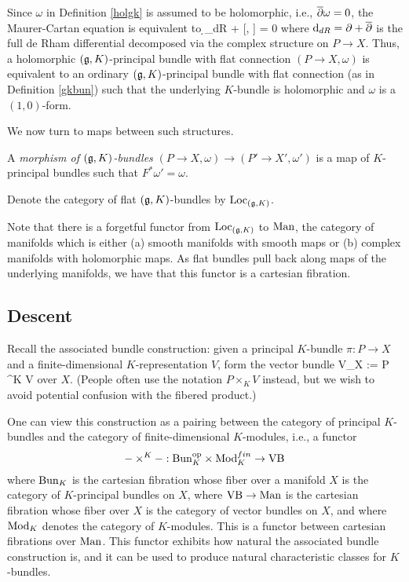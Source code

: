\begin{rmk} 
Since $\omega$ in Definition \ref{holgk} is assumed to be holomorphic, i.e., $\overline{\partial} \omega = 0$, 
the Maurer-Cartan equation is equivalent to 
\ben
\d_{dR} \omega +  [\omega, \omega] = 0
\een 
where ${\rm d}_{dR} = \partial + \overline{\partial}$ is the full de Rham differential decomposed via the complex structure on $P \to X$. 
Thus, a holomorphic $(\mathfrak g,K)$-principal bundle with flat connection $(P \to X, \omega)$ is equivalent to 
an ordinary $(\mathfrak g,K)$-principal bundle with flat connection (as in Definition \ref{gkbun}) such that 
the underlying $K$-bundle is holomorphic and $\omega$ is a $(1,0)$-form.
\end{rmk}

We now turn to maps between such structures.

\begin{dfn}
A {\em morphism of $(\mathfrak g,K)$-bundles} $(P \to X, \omega) \to (P' \to X', \omega')$ is a map of $K$-principal bundles
\ben
{}
\een
such that $F^* \omega' = \omega$. 

Denote the category of flat $(\mathfrak g,K)$-bundles by ${\rm Loc}_{(\mathfrak g,K)}$. 
\end{dfn}

Note that there is a forgetful functor from  ${\rm Loc}_{(\mathfrak g,K)}$ to ${\rm
  Man}$, the category of manifolds which is either (a) smooth manifolds
with smooth maps or (b) complex manifolds with holomorphic maps. As flat bundles pull back along maps of the underlying manifolds,
we have that this functor is a cartesian fibration.

\subsection{Descent}

Recall the associated bundle construction: given a principal $K$-bundle $\pi : P \to X$ and a finite-dimensional $K$-representation $V$, form the vector bundle
\ben
V_X := P \times^K V
\een
over $X$. 
(People often use the notation $P\times_K V$ instead, but we wish to avoid potential confusion with the fibered product.)

One can view this construction as a pairing between the category of principal $K$-bundles and the category of finite-dimensional $K$-modules, i.e., a functor
\[
- \times^K - : {\rm Bun}_K^{{\rm op}} \times {\rm Mod}_K^{fin} \to {\rm VB}
\]
where ${\rm Bun}_K$ is the cartesian fibration whose fiber over a manifold $X$ is the category of $K$-principal bundles on $X$,
where ${\rm VB} \to {\rm Man}$ is the cartesian fibration whose fiber over $X$ is the category of vector bundles on $X$, and 
where ${\rm Mod}_K$ denotes the category of $K$-modules. This is a functor
between cartesian fibrations over ${\rm Man}$. This functor exhibits how natural the associated bundle construction is, and 
it can be used to produce natural characteristic classes for $K$-bundles.


